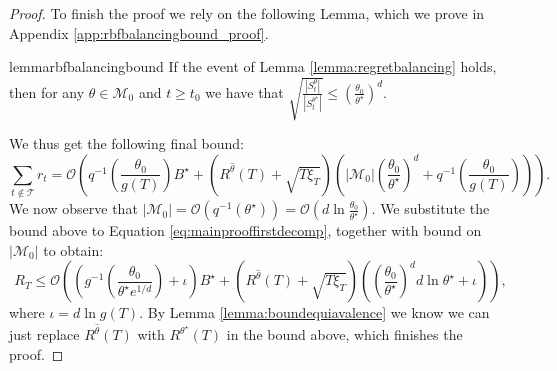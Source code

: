 \documentclass{article}
\theoremstyle{plain}
\theoremstyle{definition}
\theoremstyle{remark}
\theoremstyle{plain}
\begin{document}
\begin{proof}
To finish the proof we rely on the following Lemma, which we prove in Appendix \ref{app:rbfbalancingbound_proof}.
\begin{restatable}[]{lemma}{rbfbalancingbound}
\label{lemma:rbfbalancingbound}
If the event of Lemma \ref{lemma:regretbalancing} holds, then for any $\theta \in \mathcal{M}_0$ and $t \ge t_0$ we have that $\sqrt{\frac{|S_t^{\theta}|}{|S_t^{\theta^\star}|}} \le \left(\frac{\theta_0}{\theta^\star}\right)^{d} $.

\end{restatable}

We thus get the following final bound:
\begin{equation*}
     \sum_{t \notin \mathcal{T}} r_t = \mathcal{O} \left(q^{-1}\left(\frac{\theta_0}{g(T)}\right)B^\star + \left(R^{\hat{\theta}}(T) + \sqrt{T\xi_T}  \right) \left( |\mathcal{M}_0|\left(\frac{\theta_0}{\theta^\star} \right)^{d} + q^{-1}\left(\frac{\theta_0}{g(T)}\right) \right) \right).
\end{equation*}
We now observe that $|\mathcal{M}_0| = \mathcal{O}\left(q^{-1}\left(\theta^\star\right)\right) = \mathcal{O}\left(d \ln \frac{\theta_0}{\theta^\star} \right)$. We substitute the bound above to Equation \ref{eq:mainprooffirstdecomp}, together with bound on $|\mathcal{M}_0|$ to obtain:
\begin{equation*}
     R_T \le \mathcal{O} \left(\left(g^{-1}\left(\frac{\theta_0}{\theta^\star e^{1/d}} \right)+ \iota \right)B^\star + \left(R^{\hat{\theta}}(T) + \sqrt{T\xi_T}  \right) \left(\left(\frac{\theta_0}{\theta^\star} \right)^{d}d \ln \theta^\star + \iota \right) \right),
\end{equation*}
where $\iota = d \ln g(T)$. By Lemma \ref{lemma:boundequiavalence} we know we can just replace $R^{\hat{\theta}}(T)$ with $R^{\theta^\star}(T)$ in the bound above, which finishes the proof.

\end{proof}
\end{document}
